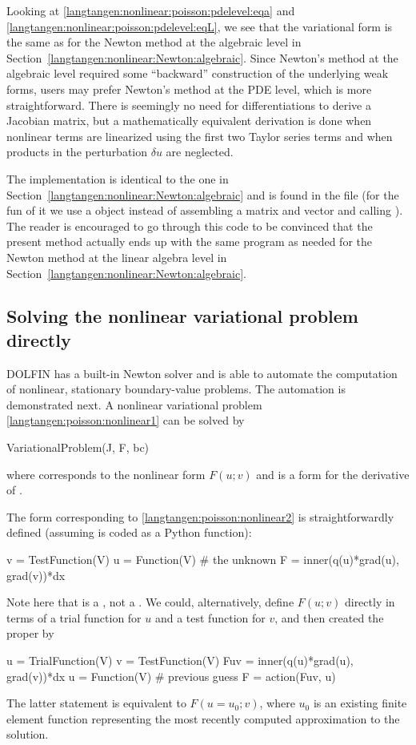 Looking at \eqref{langtangen:nonlinear:poisson:pdelevel:eqa} and
\eqref{langtangen:nonlinear:poisson:pdelevel:eqL}, we see that the
variational form is the same as for the Newton method at the algebraic
level in Section~\ref{langtangen:nonlinear:Newton:algebraic}. Since
Newton's method at the algebraic level required some ``backward''
construction of the underlying weak forms, \fenics{} users may prefer
Newton's method at the PDE level, which is more straightforward.  There is
seemingly no need for differentiations to derive a Jacobian matrix, but
a mathematically equivalent derivation is done when nonlinear terms are
linearized using the first two Taylor series terms and when products in
the perturbation $\delta u$ are neglected.

The implementation is identical to the one in
Section~\ref{langtangen:nonlinear:Newton:algebraic} and is found in
the file  (for the fun of it we use
a  object instead of assembling a matrix and
vector and calling ). The reader is encouraged to go
through this code to be convinced that the present method actually
ends up with the same program as needed for the Newton method at
the linear algebra level in Section~\ref{langtangen:nonlinear:Newton:algebraic}.

\subsection{Solving the nonlinear variational problem directly}
\label{langtangen:nonlinear:Newton:auto}

DOLFIN has a built-in Newton solver and is able to automate the
computation of nonlinear, stationary boundary-value problems.
The automation is demonstrated next. A nonlinear variational
problem \eqref{langtangen:poisson:nonlinear1} can be solved by
\begin{python}
VariationalProblem(J, F, bc)
\end{python}
where  corresponds to the nonlinear form $F(u;v)$ and
 is a form for the derivative of .

The  form corresponding to \eqref{langtangen:poisson:nonlinear2}
is straightforwardly defined (assuming  is
coded as a Python function):
\begin{python}
v = TestFunction(V)
u = Function(V)  # the unknown
F = inner(q(u)*grad(u), grad(v))*dx
\end{python}
Note here that  is a , not a .
We could, alternatively, define $F(u;v)$ directly in terms of
a trial function for $u$ and a test function for $v$, and then
created the proper  by
\begin{python}
u = TrialFunction(V)
v = TestFunction(V)
Fuv = inner(q(u)*grad(u), grad(v))*dx
u = Function(V)  # previous guess
F = action(Fuv, u)
\end{python}
The latter statement is equivalent to $F(u=u_0; v)$, where $u_0$ is
an existing finite element function representing the most recently
computed approximation to the solution.


